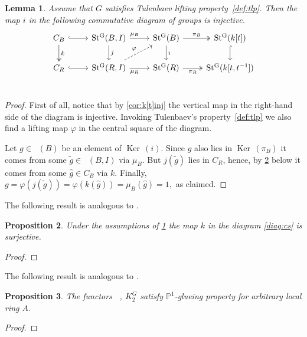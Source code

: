 \documentclass[oneside,12pt]{amsart}
\DeclareRobustCommand{\VAN}[2]{#1}
\numberwithin{equation}{section}
\newtheorem{lem}{Lemma}
\numberwithin{lem}{section}
\newtheorem{prop}[lem]{Proposition}
\theoremstyle{definition}
\theoremstyle{remark}
\DeclareMathOperator{\St}{St^G}
\DeclareMathOperator{\Bigker}{Ker\,}
\newcommand{\Pro}{\mathbb{P}}
\begin{document}
\begin{lem} \label{lem:tulinj} Assume that $G$ satisfies Tulenbaev lifting property~\ref{def:tlp}. 
Then the map $i$ in the following commutative diagram of groups is injective.
\begin{equation} \label{diag:cs} \begin{tikzcd} 
C_{B} \ar[r, hookrightarrow] \ar[d, "k", twoheadrightarrow] & \St(B, I) \ar[r, "\mu_B" near start] \ar[d, "j"] & \ar[d, "i"] \St(B) \ar[r, "\pi_B", twoheadrightarrow] & \St(k[t]) \ar[d, hookrightarrow] \\     
C_{R} \ar[r, hookrightarrow]                                & \St(R, I) \ar[ur, dashrightarrow, "\varphi"] \ar[r, "\mu_R"' near start] & \St(R) \ar[r, "\pi_R"', twoheadrightarrow] & \St(k[t, t^{-1}]) \\ \end{tikzcd} \end{equation} \end{lem}
\begin{proof} First of all, notice that by \cref{cor:k[t]inj} the vertical map in the right-hand side of the diagram is injective.
 Invoking Tulenbaev's property~\ref{def:tlp} we also find a lifting map $\varphi$ in the central square of the diagram.

 Let $g \in \St(B)$ be an element of $\Bigker(i)$.
 Since $g$ also lies in $\Bigker(\pi_B)$ it comes from some $\widetilde{g} \in \St(B, I)$ via $\mu_B$.
 But $j(\widetilde{g})$ lies in $C_R$, hence, by \cref{prop:kersurj} below it comes from some $\widehat{g} \in C_B$ via $k$.
 Finally, $g = \varphi(j(\widetilde{g})) = \varphi(k(\widehat{g})) = \mu_B(\widehat{g}) = 1,$ as claimed. \end{proof}

The following result is analogous to \cite[Proposition~4.1]{Tu}.
\begin{prop} \label{prop:kersurj} Under the assumptions of \cref{lem:tulinj} the map $k$ in the diagram \eqref{diag:cs} is surjective. \end{prop}
\begin{proof}
\end{proof}

The following result is analogous to \cite[Proposition~4.3]{Tu}.
\begin{prop} \label{prop:p1g} The functors $\St$, $K_2^G$ satisfy $\Pro^1$-glueing property for arbitrary local ring $A$.
\end{prop}
\begin{proof}
\end{proof}

\DeclareRobustCommand{\VAN}[2]{#2}
\printbibliography
\end{document}
